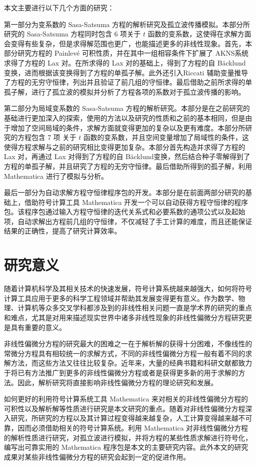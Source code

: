 本文主要进行以下几个方面的研究：

第一部分为变系数的 Sasa-Satsuma 方程的解析研究及孤立波传播模拟。本部分所研究的  Sasa-Satsuma 方程同时包含 6 项关于 $t$ 函数的变系数，这使得在求解方面会变得有些复杂，但是求得解范围也更广，也能描述更多的非线性现象。首先，本部分研究方程的 Painlev\'{e} 可积性质，并在其中一组相容条件下扩展了 AKNS系统求得了方程的 Lax 对。在所求得的 Lax 对的基础上，得到了方程的自 B\"{a}cklund变换，进而根据该变换得到了方程的单孤子解。此外还引入Riccati 辅助变量推导了方程的无穷守恒律，列出并且验证了前几组的守恒律。最后借助之前所求得的单孤子解，进行了孤立波的模拟并分析了方程各项的系数对于孤立波传播的影响。

第二部分为局域变系数的 Sasa-Satsuma 方程的解析研究。本部分是在之前研究的基础进行更加深入的探索，使用的方法以及研究的性质和之前的基本相同，但是由于增加了空间局域的条件，求解方面就变得更加的复杂以及更有难度。本部分所研究的方程包含 7 项 关于 $t$ 函数的变系数，并且空间变量增加了局域性的条件，这使得方程求解与之前的研究相比变得更加复杂。本部分首先构造并求得了方程的 Lax 对，再通过 Lax 对得到了方程的自 B\"{a}cklund变换，然后结合种子零解得到了方程的单孤子解，并且研究了方程的无穷守恒律。最后借助所得到的孤子解，利用 Mathematica 进行了模拟与分析。

最后一部分为自动求解方程守恒律程序包的开发。本部分是在前面两部分研究的基础上，借助符号计算工具 Mathematica 开发一个可以自动获得方程守恒律的程序包。该程序包通过输入方程守恒律的迭代关系式和必要系数的通项公式以及起始项，自动求解出方程前几组的守恒律，不仅减轻了手工计算的难度，而且还能保证结果的正确性，提高了研究计算效率。

\section{研究意义}
随着计算机科学及其相关技术的快速发展，符号计算系统越来越强大，如何将符号计算工具应用于更多的科学工程领域并帮助其发展变得更有意义。作为数学、物理、计算机等众多交叉学科都涉及到的非线性相关问题一直是学术界的研究的重点和难点，尤其是对用来描述现实世界中诸多非线性现象的非线性偏微分方程研究更是具有重要的意义。

非线性偏微分方程的研究最大的困难之一在于解析解的获得十分困难，不像线性的常微分方程具有相较统一的求解方式，不同的非线性偏微分方程一般有着不同的求解方法，而这些方法又往往比较复杂。近年来，大量的经典书籍和科研文献都致力于将已有方法推广到更多的非线性偏微分方程或者是获得更多新的用于求解的方法。因此，解析研究将直接影响非线性偏微分方程的理论研究和发展。

如何更好的利用符号计算系统工具 Mathematica 来对相关的非线性偏微分方程的可积性以及解析解等性质进行研究是本文研究的重点。随着对非线性偏微分方程深入研究，所研究的方程以及其计算过程变得越来越复杂，人工计算变得越来越不可靠，因而必须借助相关的符号计算系统。利用 Mathematica 对非线性偏微分方程的解析性质进行研究，对孤立波进行模拟，并将方程的某些性质求解进行符号化，编写出可靠实用的 Mathematica 程序包是本文的主要研究内容。此外本文的研究成果对某些非线性偏微分方程的研究会起到一定的促进作用。

